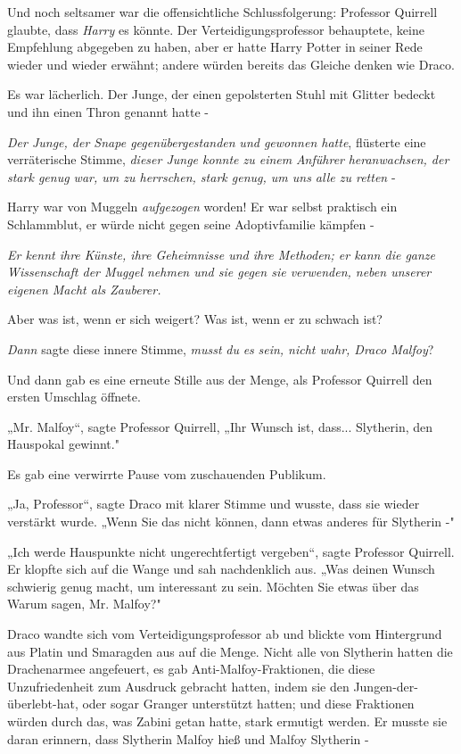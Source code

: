 {Und noch seltsamer war die offensichtliche Schlussfolgerung: Professor Quirrell glaubte, dass \emph{Harry} es könnte. Der Verteidigungsprofessor behauptete, keine Empfehlung abgegeben zu haben, aber er hatte Harry Potter in seiner Rede wieder und wieder erwähnt; andere würden bereits das Gleiche denken wie Draco.

Es war lächerlich. Der Junge, der einen gepolsterten Stuhl mit Glitter bedeckt und ihn einen Thron genannt hatte -

\emph{Der Junge, der Snape gegenübergestanden} \emph{und gewonnen hatte}, flüsterte eine verräterische Stimme, \emph{dieser Junge konnte zu einem} \emph{Anführer} \emph{heranwachsen, der stark genug war, um zu herrschen, stark genug, um uns alle zu retten} -

Harry war von Muggeln \emph{aufgezogen} worden! Er war selbst praktisch ein Schlammblut, er würde nicht gegen seine Adoptivfamilie kämpfen -

\emph{\emph{Er kennt ihre Künste, ihre Geheimnisse und ihre Methoden; er kann die ganze Wissenschaft der Muggel nehmen und sie gegen sie verwenden, neben unserer eigenen Macht als Zauberer.}}

Aber was ist, wenn er sich weigert? Was ist, wenn er zu schwach ist?

\emph{Dann} sagte diese innere Stimme, \emph{musst} \emph{du} \emph{es} \emph{sein, nicht wahr, Draco Malfoy}?

Und dann gab es eine erneute Stille aus der Menge, als Professor Quirrell den ersten Umschlag öffnete.

„Mr. Malfoy“, sagte Professor Quirrell, „Ihr Wunsch ist, dass... Slytherin, den Hauspokal gewinnt."

Es gab eine verwirrte Pause vom zuschauenden Publikum.

„Ja, Professor“, sagte Draco mit klarer Stimme und wusste, dass sie wieder verstärkt wurde. „Wenn Sie das nicht können, dann etwas anderes für Slytherin -"

„Ich werde Hauspunkte nicht ungerechtfertigt vergeben“, sagte Professor Quirrell. Er klopfte sich auf die Wange und sah nachdenklich aus. „Was deinen Wunsch schwierig genug macht, um interessant zu sein. Möchten Sie etwas über das Warum sagen, Mr. Malfoy?"

Draco wandte sich vom Verteidigungsprofessor ab und blickte vom Hintergrund aus Platin und Smaragden aus auf die Menge. Nicht alle von Slytherin hatten die Drachenarmee angefeuert, es gab Anti-Malfoy-Fraktionen, die diese Unzufriedenheit zum Ausdruck gebracht hatten, indem sie den Jungen-der-überlebt-hat, oder sogar Granger unterstützt hatten; und diese Fraktionen würden durch das, was Zabini getan hatte, stark ermutigt werden. Er musste sie daran erinnern, dass Slytherin Malfoy hieß und Malfoy Slytherin -

}
